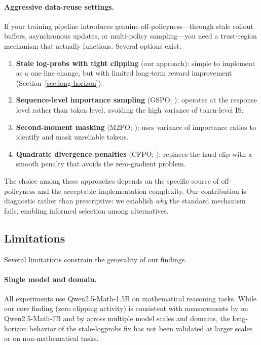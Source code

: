 \paragraph{Aggressive data-reuse settings.}
If your training pipeline introduces genuine off-policyness---through stale rollout buffers, asynchronous updates, or multi-policy sampling---you need a trust-region mechanism that actually functions.
Several options exist:
\begin{enumerate}[label=(\alph*)]
    \item \textbf{Stale log-probs with tight clipping} (our approach): simple to implement as a one-line change, but with limited long-term reward improvement (Section~\ref{sec:long-horizon}).
    \item \textbf{Sequence-level importance sampling} (GSPO; \citealt{gspo2025}): operates at the response level rather than token level, avoiding the high variance of token-level IS.
    \item \textbf{Second-moment masking} (M2PO; \citealt{m2po2025}): uses variance of importance ratios to identify and mask unreliable tokens.
    \item \textbf{Quadratic divergence penalties} (CFPO; \citealt{cfpo2025}): replaces the hard clip with a smooth penalty that avoids the zero-gradient problem.
\end{enumerate}
The choice among these approaches depends on the specific source of off-policyness and the acceptable implementation complexity.
Our contribution is diagnostic rather than prescriptive: we establish \emph{why} the standard mechanism fails, enabling informed selection among alternatives.

\subsection{Limitations}
\label{sec:limitations}

Several limitations constrain the generality of our findings.

\paragraph{Single model and domain.}
All experiments use Qwen2.5-Math-1.5B on mathematical reasoning tasks.
While our core finding (zero clipping activity) is consistent with measurements by \citet{chen2025iclr} on Qwen2.5-Math-7B and by \citet{prosperity2025} across multiple model scales and domains, the long-horizon behavior of the stale-logprobs fix has not been validated at larger scales or on non-mathematical tasks.

